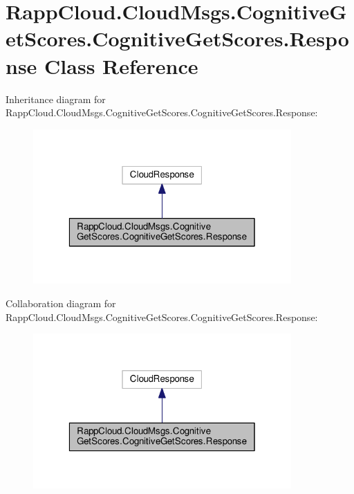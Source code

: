 \hypertarget{classRappCloud_1_1CloudMsgs_1_1CognitiveGetScores_1_1CognitiveGetScores_1_1Response}{\section{Rapp\-Cloud.\-Cloud\-Msgs.\-Cognitive\-Get\-Scores.\-Cognitive\-Get\-Scores.\-Response Class Reference}
\label{classRappCloud_1_1CloudMsgs_1_1CognitiveGetScores_1_1CognitiveGetScores_1_1Response}
}


Inheritance diagram for Rapp\-Cloud.\-Cloud\-Msgs.\-Cognitive\-Get\-Scores.\-Cognitive\-Get\-Scores.\-Response\-:
\nopagebreak
\begin{figure}[H]
\begin{center}
\leavevmode
\includegraphics[width=280pt]{classRappCloud_1_1CloudMsgs_1_1CognitiveGetScores_1_1CognitiveGetScores_1_1Response__inherit__graph}
\end{center}
\end{figure}


Collaboration diagram for Rapp\-Cloud.\-Cloud\-Msgs.\-Cognitive\-Get\-Scores.\-Cognitive\-Get\-Scores.\-Response\-:
\nopagebreak
\begin{figure}[H]
\begin{center}
\leavevmode
\includegraphics[width=280pt]{classRappCloud_1_1CloudMsgs_1_1CognitiveGetScores_1_1CognitiveGetScores_1_1Response__coll__graph}
\end{center}
\end{figure}
